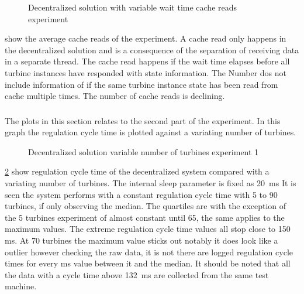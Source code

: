 \begin{figure}[h!]
	\centering
	
	\caption{Decentralized solution with variable wait time cache reads experiment}
	\label{fig:exp:decen:sleep-cache}
\end{figure}

 show the average cache reads of the experiment.
A cache read only happens in the decentralized solution and is a consequence of the separation of receiving data in a separate thread.
The cache read happens if the wait time elapses before all turbine instances have responded with state information. The Number dos not include information of if the same turbine instance state has been read from cache multiple times.
The number of cache reads is declining. 

\clearpage
\subsubsection{}
The plots in this section relates to the second part of the  experiment. In this graph the regulation cycle time is plotted against a variating number of turbines.

\begin{figure}[h!]
	\centering
	
	\caption{Decentralized solution variable number of turbines experiment 1}
	\label{fig:exp:decen:turbines}
\end{figure}

\cref{fig:exp:decen:turbines} show regulation cycle time of the decentralized system compared with a variating number of turbines. The internal sleep parameter is fixed as 20~ms
It is seen the system performs with a constant regulation cycle time with 5 to 90 turbines, if only observing the median.
The quartiles are with the exception of the 5 turbines experiment of almost constant until 65, the same applies to the maximum values.
The extreme regulation cycle time values all  stop close to 150 ms.
At 70 turbines the maximum value sticks out notably it does look like a outlier however checking the raw data, it is not there are logged regulation cycle times for every ms value between it and the median.
It should be noted that all the data with a cycle time above 132~ms are collected from the same test machine.

